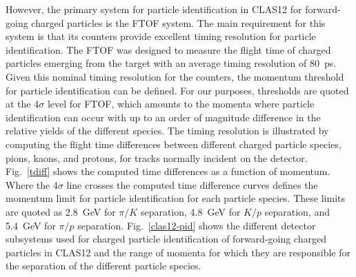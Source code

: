 \documentclass{elsart}
\begin{document}
However, the primary system for particle identification in CLAS12 for forward-going charged particles
is the FTOF system. The main requirement for this system is that its counters provide excellent timing
resolution for particle identification. The FTOF  was designed to measure the flight time of charged
particles emerging from the target with an average timing resolution of 80~ps. Given this nominal timing
resolution for the counters, the momentum threshold for particle identification can be defined. For our
purposes, thresholds are quoted at the 4$\sigma$ level for FTOF, which amounts to the momenta where
particle identification can occur with up to an order of magnitude difference in the relative yields of the
different species. The timing resolution is illustrated by computing the flight time differences between
different charged particle species, pions, kaons, and protons, for tracks normally incident on the detector.
Fig.~\ref{tdiff} shows the computed time differences as a function of momentum. Where the 4$\sigma$
line crosses the computed time difference curves defines the momentum limit for particle identification
for each particle species. These limits are quoted as 2.8~GeV for $\pi/K$ separation, 4.8~GeV for $K/p$
separation, and 5.4~GeV for $\pi/p$ separation.  Fig.~\ref{clas12-pid} shows the different detector
subsystems used for charged particle identification of forward-going charged particles in CLAS12 and the
range of momenta for which they are responsible for the separation of the different particle species.
\end{document}
